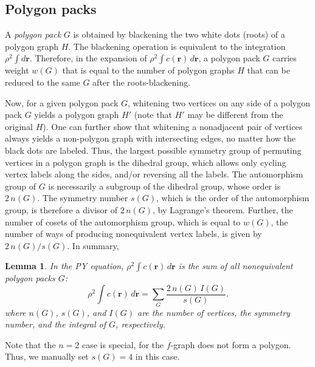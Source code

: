 \documentclass[preprint]{revtex4-1}
\newtheorem{lemm}[thrm]{Lemma}
\newcommand{\vct}[1]{\mathbf{#1}}
\providecommand{\vr}{} %
\renewcommand{\vr}{\vct{r}}
\begin{document}
\subsection{Polygon packs}



A \emph{polygon pack} $G$ is obtained
  by blackening the two white dots (roots) of a polygon graph $H$.
%
The blackening operation is equivalent to the integration $\rho^2 \int d\vr$.
%
Therefore, in the expansion of $\rho^2 \int c(\vr) \, d\vr$,
  a polygon pack $G$ carries weight $w(G)$
  that is equal to the number of polygon graphs $H$ that
  can be reduced to the same $G$ after the roots-blackening.

Now, for a given polygon pack $G$,
  whitening two vertices on any side of
  a polygon pack $G$
  yields a polygon graph $H'$
  (note that $H'$ may be different from the original $H$).
%
One can further show that
  whitening a nonadjacent pair of vertices always yields
  a non-polygon graph with intersecting edges,
  no matter how the black dots are labeled.
%
Thus,
  the largest possible symmetry group of
  permuting vertices in a polygon graph
  is the dihedral group,
  which allows only cycling vertex labels along the sides,
  and/or reversing all the labels.
%
The automorphism group of $G$
  is necessarily a subgroup of the dihedral group,
  whose order is $2 \, n(G)$.
%
The symmetry number $s(G)$,
  which is the order of the automorphism group,
  is therefore a divisor of $2 \, n(G)$,
  by Lagrange's theorem.
%
Further,
  the number of cosets of the automorphism group,
  which is equal to $w(G)$, the number of ways of
  producing nonequivalent vertex labels,
  is given by $2 \, n(G) / s(G)$.
%
In summary,
\begin{lemm}
In the PY equation,
  $\rho^2 \int c(\vr) \, d\vr$ is the sum of
  all nonequivalent polygon packs $G$:
  \begin{equation}
      \rho^2 \int c(\vr) \, d\vr
    = \sum_{G} \frac{ 2 \, n(G) \, I(G) }{ s(G) }.
  \label{eq:pykappasum}
  \end{equation}
  where $n(G)$, $s(G)$, and $I(G)$ are
  the number of vertices,
  the symmetry number,
  and the integral of $G$,
  respectively.
  \label{thm:pykappasum}
\end{lemm}
%
Note that the $n = 2$ case is special,
  for the $f$-graph does not form a polygon.
Thus, we manually set $s(G) = 4$ in this case.
\end{document}

